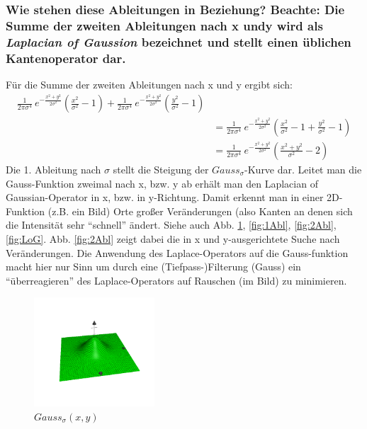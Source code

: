 \subsubsection*{Wie stehen diese Ableitungen in Beziehung? Beachte: Die Summe der zweiten Ableitungen nach x undy wird als \emph{Laplacian of Gaussion} bezeichnet und stellt einen \"ublichen Kantenoperator dar.}

F\"ur die Summe der zweiten Ableitungen nach x und y ergibt sich:
\begin{align*}
\frac{1}{2 \pi \sigma^4}~e^{-\frac{x^2 + y^2}{2 \sigma^2}} (\frac{x^2}{\sigma^2} - 1) + \frac{1}{2 \pi \sigma^4}~e^{-\frac{x^2 + y^2}{2 \sigma^2}} (\frac{y^2}{\sigma^2} - 1)\\
&= \frac{1}{2 \pi \sigma^4}~e^{-\frac{x^2 + y^2}{2 \sigma^2}} (\frac{x^2}{\sigma^2} - 1 + \frac{y^2}{\sigma^2} - 1)\\
&= \frac{1}{2 \pi \sigma^4}~e^{-\frac{x^2 + y^2}{2 \sigma^2}} (\frac{x^2 + y^2}{\sigma^2} - 2)
\end{align*}
Die 1. Ableitung nach $\sigma$ stellt die Steigung der $Gauss_{\sigma}$-Kurve dar. Leitet man die Gauss-Funktion zweimal nach x, bzw. y ab erh\"alt man den Laplacian of Gaussian-Operator in x, bzw. in y-Richtung.
Damit erkennt man in einer 2D-Funktion (z.B. ein Bild) Orte gro{\ss}er Ver\"anderungen (also Kanten an denen sich die Intensit\"at sehr ``schnell'' \"andert.
Siehe auch Abb. \ref{fig:Gauss}, \ref{fig:1Abl}, \ref{fig:2Abl}, \ref{fig:LoG}.
Abb. \ref{fig:2Abl} zeigt dabei die in x und y-ausgerichtete Suche nach Ver\"anderungen. Die Anwendung des  Laplace-Operators auf die Gauss-funktion macht hier nur Sinn um durch eine (Tiefpass-)Filterung (Gauss) ein ``\"uberreagieren'' des Laplace-Operators auf Rauschen (im Bild) zu minimieren.

\begin{figure}[h] %
   \centering
   \includegraphics[width=0.4\textwidth]{Uebung6/Gauss.pdf} 
   \caption{$Gauss_{\sigma}(x,y)$}
   \label{fig:Gauss}
\end{figure}

